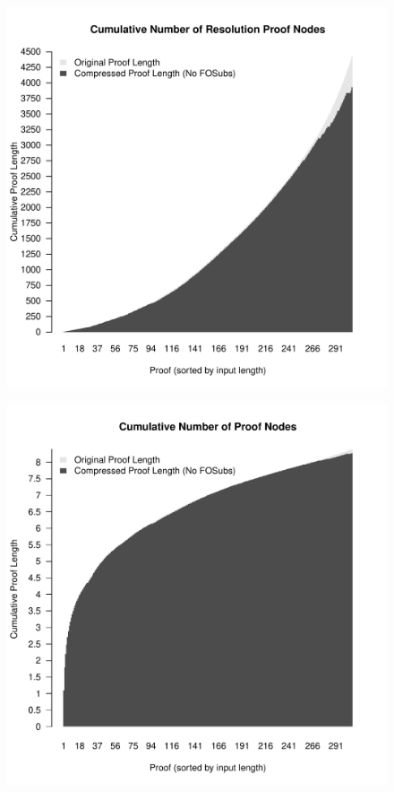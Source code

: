 \begin{figure}
\includegraphics[scale=0.5]{images/cumulative_res_nodes_no_subs.pdf}
\end{figure}
\begin{figure}
\includegraphics[scale=0.5]{images/cumulative_res_nodes_no_subs_log.pdf}
\end{figure}
